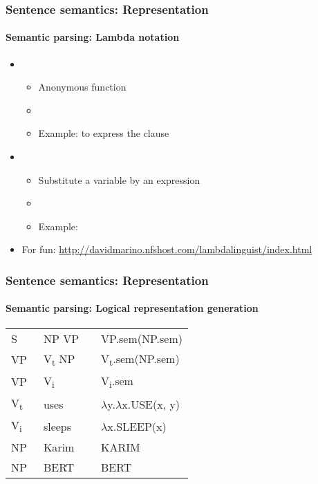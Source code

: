 \documentclass[xcolor=table]{beamer}
\begin{document}
\begin{frame}
	\frametitle{Sentence semantics: Representation}
	\framesubtitle{Semantic parsing: Lambda notation}
	
	\begin{itemize}
		\item {}
		\begin{itemize}
			\item Anonymous function
			\item {}
			\item Example:  to express the clause 
		\end{itemize}
		
		\item {}
		\begin{itemize}
			\item Substitute a variable by an expression
			\item \keyword{$ \phi (\psi) $}
			\item Example: 
		\end{itemize}
		
		\item For fun: \url{http://davidmarino.nfshost.com/lambdalinguist/index.html}
	\end{itemize}
	
\end{frame}

\begin{frame}
	\frametitle{Sentence semantics: Representation}
	\framesubtitle{Semantic parsing: Logical representation generation}
	
	\begin{center}
		\small\bfseries
		\begin{tabular}{llll}
			\hline\hline
			S  & \textrightarrow\ NP VP && VP.sem(NP.sem) \\
			VP & \textrightarrow\ V\textsubscript{t} NP && V\textsubscript{t}.sem(NP.sem)\\
			VP & \textrightarrow\ V\textsubscript{i} && V\textsubscript{i}.sem \\
			V\textsubscript{t}  & \textrightarrow\ uses && $ \lambda $y.$ \lambda $x.USE(x, y) \\
			V\textsubscript{i}  & \textrightarrow\ sleeps && $ \lambda $x.SLEEP(x) \\
			NP  & \textrightarrow\  Karim && KARIM \\
			NP  & \textrightarrow\  BERT && BERT \\
			\hline\hline
		\end{tabular}
		
	\end{center}
	
	
\end{frame}
\end{document}
